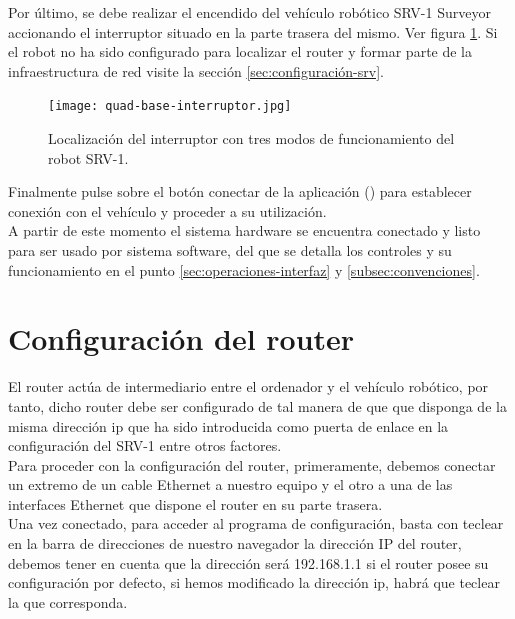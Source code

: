 Por último, se debe realizar el encendido del vehículo robótico SRV-1 Surveyor accionando el interruptor situado en la parte trasera del mismo. Ver figura \ref{fig:interruptor-srv}. Si el robot no ha sido configurado para localizar el router y formar parte de la infraestructura de red visite la sección \ref{sec:configuración-srv}.\\

\begin{figure}[H]
  \begin{center}
    \texttt{[image: quad-base-interruptor.jpg]}
  \end{center}
  \caption{Localización del interruptor con tres modos de funcionamiento del robot SRV-1.}
  \label{fig:interruptor-srv}
\end{figure}

Finalmente pulse sobre el botón conectar de la aplicación () para establecer conexión con el vehículo y proceder a su utilización.\\

A partir de este momento el sistema hardware se encuentra conectado y listo para ser usado por sistema software, del que se detalla los controles y su funcionamiento en el punto \ref{sec:operaciones-interfaz} y \ref{subsec:convenciones}.

\section{Configuración del router}
\label{sec:configuración-router}

El router actúa de intermediario entre el ordenador y el vehículo robótico, por tanto, dicho router debe ser configurado de tal manera de que que disponga de la misma dirección ip que ha sido introducida como puerta de enlace en la configuración del SRV-1 entre otros factores.\\

Para proceder con la configuración del router, primeramente, debemos conectar un extremo de un cable Ethernet a nuestro equipo y el otro a una de las interfaces Ethernet que dispone el router en su parte trasera.\\

Una vez conectado, para acceder al programa de configuración, basta con teclear en la barra de direcciones de nuestro navegador la dirección IP del router, debemos tener en cuenta que la dirección será 192.168.1.1 si el router posee su configuración por defecto, si hemos modificado la dirección ip, habrá que teclear la que corresponda.\\

